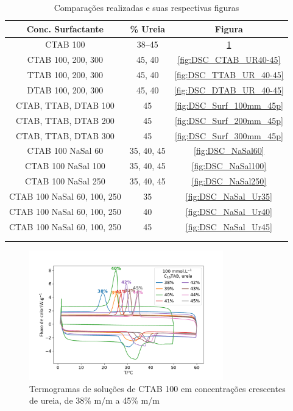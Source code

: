 		\begin{longtable}[h]{c c c}
			\toprule
			Conc. Surfactante \mM     & \% Ureia		& Figura 			\\
			\midrule
			CTAB 100	  & 38--45			& \ref{fig:DSC_CTAB_UR38-45}	\\
			CTAB 100, 200, 300	& 45, 40	& \ref{fig:DSC_CTAB_UR40-45}	\\
			TTAB 100, 200, 300	& 45, 40	& \ref{fig:DSC_TTAB_UR_40-45}	\\
			DTAB 100, 200, 300	& 45, 40	& \ref{fig:DSC_DTAB_UR_40-45}	\\
			CTAB, TTAB, DTAB 100	& 45	& \ref{fig:DSC_Surf_100mm_45p}	\\
			CTAB, TTAB, DTAB 200	& 45	& \ref{fig:DSC_Surf_200mm_45p}	\\
			CTAB, TTAB, DTAB 300	& 45	& \ref{fig:DSC_Surf_300mm_45p}	\\
			\midrule
			CTAB 100 NaSal 60	& 35, 40, 45	& \ref{fig:DSC_NaSal60}		\\
			CTAB 100 NaSal 100	& 35, 40, 45	& \ref{fig:DSC_NaSal100}	\\
			CTAB 100 NaSal 250	& 35, 40, 45	& \ref{fig:DSC_NaSal250}	\\
			CTAB 100 NaSal 60, 100, 250 & 35 	& \ref{fig:DSC_NaSal_Ur35}  \\
			CTAB 100 NaSal 60, 100, 250 & 40	& \ref{fig:DSC_NaSal_Ur40}  \\
			CTAB 100 NaSal 60, 100, 250	& 45	& \ref{fig:DSC_NaSal_Ur45}  \\
			\bottomrule
			\caption{Comparações realizadas e suas respectivas figuras} \\
			\label{tab:refs_DSC} \\
		\end{longtable}
		
		\begin{figure}[h]
			\centering
			\includegraphics[width=0.75\textwidth]{./imagens/dsc/CTAB_porc_ur}
			\caption{Termogramas de soluções de CTAB 100 \mM{} em concentrações crescentes de ureia, de 38\% m/m a 45\% m/m}
			\label{fig:DSC_CTAB_UR38-45}
		\end{figure}
		
